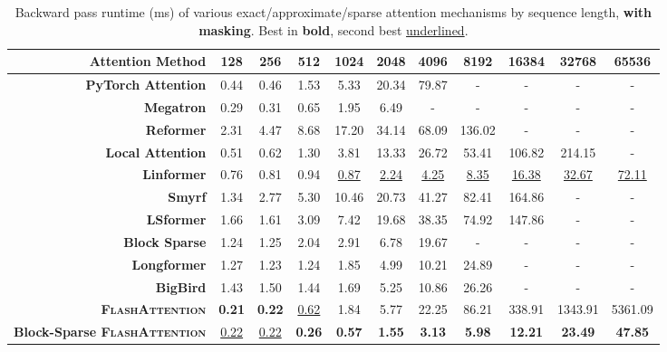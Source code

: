 \documentclass{article}
\newcommand{\sysname}{\textsc{FlashAttention}\xspace}
\begin{document}
\begin{table}
\centering
\scriptsize
\captionsetup{font=small}
\caption{Backward pass runtime (ms) of various exact/approximate/sparse attention mechanisms by sequence length, \textbf{with masking}. Best in \textbf{bold}, second best \underline{underlined}.}
\begin{tabular}{@{}r|cccccccccc@{}}
\toprule
\textbf{Attention Method} & 128 & 256 & 512 & 1024 & 2048 & 4096 & 8192 & 16384 & 32768 & 65536 \\
\hline
\textbf{PyTorch Attention} & 0.44 & 0.46 & 1.53 & 5.33 & 20.34 & 79.87 & - & - & - & - \\
\textbf{Megatron} & 0.29 & 0.31 & 0.65 & 1.95 & 6.49 & - & - & - & - & - \\
\hline
\textbf{Reformer} & 2.31 & 4.47 & 8.68 & 17.20 & 34.14 & 68.09 & 136.02 & - & - & - \\
\textbf{Local Attention} & 0.51 & 0.62 & 1.30 & 3.81 & 13.33 & 26.72 & 53.41 & 106.82 & 214.15 & - \\
\textbf{Linformer} & 0.76 & 0.81 & 0.94 & \underline{0.87} & \underline{2.24} & \underline{4.25} & \underline{8.35} & \underline{16.38} & \underline{32.67} & \underline{72.11} \\
\textbf{Smyrf} & 1.34 & 2.77 & 5.30 & 10.46 & 20.73 & 41.27 & 82.41 & 164.86 & - & - \\
\textbf{LSformer} & 1.66 & 1.61 & 3.09 & 7.42 & 19.68 & 38.35 & 74.92 & 147.86 & - & - \\
\hline
\textbf{Block Sparse} & 1.24 & 1.25 & 2.04 & 2.91 & 6.78 & 19.67 & - & - & - & - \\
\textbf{Longformer} & 1.27 & 1.23 & 1.24 & 1.85 & 4.99 & 10.21 & 24.89 & - & - & - \\
\textbf{BigBird} & 1.43 & 1.50 & 1.44 & 1.69 & 5.25 & 10.86 & 26.26 & - & - & - \\
\hline
\textbf{\sysname} & \textbf{0.21} & \textbf{0.22} & \underline{0.62} & 1.84 & 5.77 & 22.25 & 86.21 & 338.91 & 1343.91 & 5361.09 \\
\textbf{Block-Sparse \sysname} & \underline{0.22} & \underline{0.22} & \textbf{0.26} & \textbf{0.57} & \textbf{1.55} & \textbf{3.13} & \textbf{5.98} & \textbf{12.21} & \textbf{23.49} & \textbf{47.85} \\
\bottomrule
\end{tabular}
\label{tab:masking_backward_pass}
\end{table}
\end{document}
